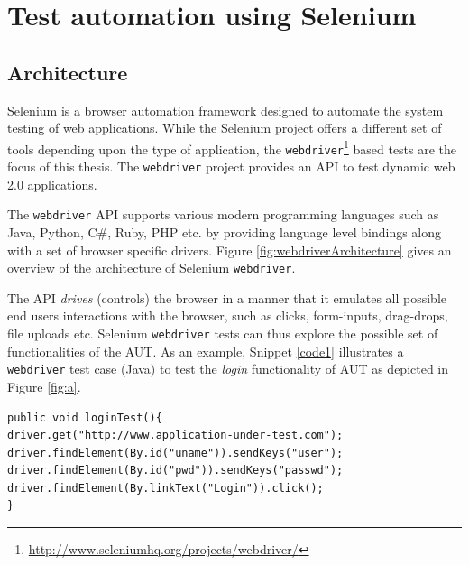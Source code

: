 \section{Test automation using Selenium}
\label{sec:SeleniumTesting}
\subsection{Architecture}
\label{ssec:webdriverArchitecture}
Selenium is a browser automation framework designed to automate the system testing of web applications. While the Selenium project offers a different set of tools depending upon the type of application, the  \texttt{webdriver}\footnote{\url{http://www.seleniumhq.org/projects/webdriver/}} based tests are the focus of this thesis. The \texttt{webdriver} project provides an API to test dynamic web 2.0 applications. 

The \texttt{webdriver} API supports various modern programming languages such as Java, Python, C\#, Ruby, PHP etc. by providing language level bindings along with a set of browser specific drivers. Figure \ref{fig:webdriverArchitecture} gives an overview of the architecture of Selenium \texttt{webdriver}.

The API \textit{drives} (controls) the browser in a manner that it emulates all possible end users interactions with the browser, such as clicks, form-inputs, drag-drops, file uploads etc. Selenium \texttt{webdriver} tests can thus explore the possible set of functionalities of the AUT. As an example, Snippet \ref{code1} illustrates a \texttt{webdriver} test case (Java) to test the \textit{login} functionality of AUT as depicted in Figure \ref{fig:a}.
\begin{center}
\begin{scriptsize}
\centering
\lstset{
  basicstyle=\ttfamily,
  columns=fullflexible,
  keepspaces=true,
}
  
\begin{lstlisting}[caption=Login test,label=code1]
public void loginTest(){
driver.get("http://www.application-under-test.com");
driver.findElement(By.id("uname")).sendKeys("user");
driver.findElement(By.id("pwd")).sendKeys("passwd");
driver.findElement(By.linkText("Login")).click();
}
\end{lstlisting}
\end{scriptsize} 
\end{center}
 

